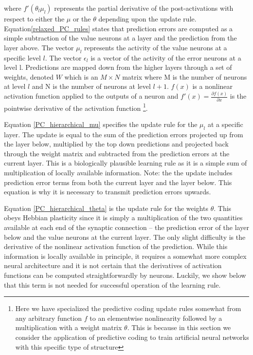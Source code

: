 where $f'(\theta_l \mu_l)$ represents the partial derivative of the post-activations with respect to either the $\mu$ or the $\theta$ depending upon the update rule. Equation\ref{relaxed_PC_rules} states that prediction errors are computed as a simple subtraction of the value neurons at a layer and the prediction from the layer above. The vector $\mu_l$ represents the activity of the value neurons at a specific level $l$. The vector $\epsilon_l$ is a vector of the activity of the error neurons at a level l. Predictions are mapped down from the higher layers through a set of weights, denoted $W$ which is an $M \times N$ matrix where M is the number of neurons at level $l$ and N is the number of neurons at level $l+1$. $f(x)$ is a nonlinear activation function applied to the outputs of a neuron and $f'(x) = \frac{\partial f(x)}{\partial x}$ is the pointwise derivative of the activation function \footnote{Here we have specialized the predictive coding update rules somewhat from any arbitrary function $f$ to an elementwise nonlinearity followed by a multiplication with a weight matrix $\theta$. This is because in this section we consider the application of predictive coding to train artificial neural networks with this specific type of structure}.

Equation \ref{PC_hierarchical_mu} specifies the update rule for the $\mu_l$ at a specific layer. The update is equal to the sum of the prediction errors projected up from the layer below, multiplied by the top down predictions and projected back through the weight matrix and subtracted from the prediction errors at the current layer. This is a biologically plausible learning rule as it is a simple sum of multiplication of locally available information. Note: the the update includes prediction error terms from both the current layer and the layer below. This equation is why it is necessary to transmit prediction errors upwards.

Equation \ref{PC_hierarchical_theta} is the update rule for the weights $\theta$. This obeys Hebbian plasticity since it is simply a multiplication of the two quantities available at each end of the synaptic connection -- the prediction error of the layer below and the value neurons at the current layer. The only slight difficulty is the derivative of the nonlinear activation function of the prediction. While this information is locally available in principle, it requires a somewhat more complex neural architecture and it is not certain that the derivatives of activation functions can be computed straightforwardly by neurons. Luckily, we show below that this term is not needed for successful operation of the learning rule.


